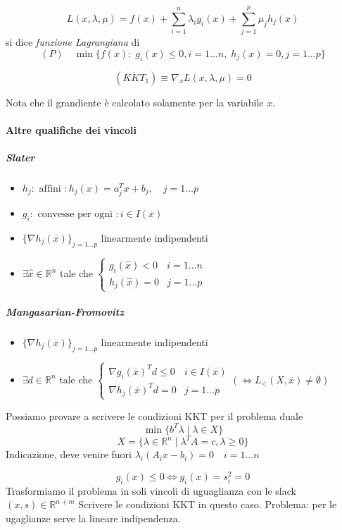 \begin{defn}
  $$ L(x, \lambda, \mu) = f(x) + \displaystyle \sum_{i=1}^{n} \lambda_i
g_i(x) + \displaystyle \sum_{j=1}^{p} \mu_j h_j(x)$$
si dice \emph{funzione Lagrangiana} di
$$ (P) \quad  \min\{f(x): \; g_i(x)\leq 0, i=1\ldots n, \;
h_j(x)=0, j=1\ldots p \}
$$
\end{defn}

\begin{observation}
$$(\overline{KKT}_1) \equiv \nabla_x L(x, \lambda, \mu) = 0$$

Nota che il grandiente \`e calcolato solamente per la variabile $x$.
\end{observation}
\paragraph{Altre qualifiche dei vincoli}

 \subparagraph{Slater}
 \begin{itemize}
 \item $h_j: \text{ affini }: h_j(x) = a_j^{T}x + b_j, \quad j=1\ldots p $
 \item $g_i: \text{ convesse per ogni  }: i \in I(\overline{x})$
 \item $\{\nabla h_j(\overline{x})\}_{j=1\ldots p }$ linearmente indipendenti
 \item $\exists \hat{x} \in \mathbb{R}^{n}$ tale che
 $ 
\left\{
  \begin{array}{ll}
  g_i(\hat{x})< 0 & i=1\ldots n \\
  h_j(\hat{x}) = 0 & j=1\ldots p
   \end{array}
\right.
$
 \end{itemize}
 \subparagraph{Mangasarian-Fromovitz}
 \begin{itemize}
 \item $\{ \nabla h_j(\overline{x})\}_{j=1\ldots p}$ linearmente indipendenti
 \item $\exists d \in \mathbb{R}^{n}$ tale che
$  
\left\{
 \begin{array}{ll}
  \nabla g_i(\overline{x})^{T}d \leq 0 & i \in I(\overline{x})  \\
  \nabla h_j(\overline{x})^{T}d = 0 & j=1\ldots p  
 \end{array}
(\Longleftrightarrow L_{<}(X, \overline{x}) \neq \emptyset)
\right.
$
 \end{itemize}

\begin{exercise}
  Possiamo provare a scrivere le condizioni KKT per il problema
  duale
  $$ \min \{ b^{T}\lambda \; | \; \lambda \in X \} $$
  $$ X = \{ \lambda \in \mathbb{R}^{n} \; | \; \lambda^{T}A = c,
  \lambda \geq 0 \}$$
Indicazione, deve venire fuori $\lambda_i(A_ix - b_i) = 0 \quad
i=1 \ldots n$
\end{exercise}
\begin{exercise}
 $$g_i(x) \leq 0
\Longleftrightarrow g_i(x) = s_i^{2} = 0
 $$
Trasformiamo il problema in soli vincoli di uguaglianza con le slack
$(x,s) \in \mathbb{R}^{n+m} $
Scrivere le condizioni KKT in questo caso.
Problema: per le ugaglianze serve la lineare indipendenza.
\end{exercise}

